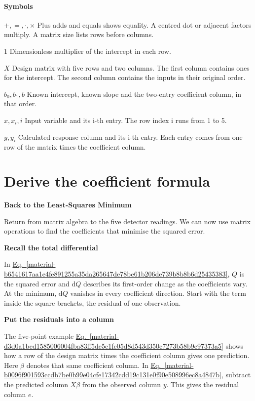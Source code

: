 \documentclass[11pt,a4paper]{article}
\begin{document}
\paragraph{Symbols}
\par\noindent\textbf{\(+,=,\cdot,\times\)} Plus adds and equals shows equality. A centred dot or adjacent factors multiply. A matrix size lists rows before columns.
\par\noindent\textbf{\(1\)} Dimensionless multiplier of the intercept in each row.
\par\noindent\textbf{\(X\)} Design matrix with five rows and two columns. The first column contains ones for the intercept. The second column contains the inputs in their original order.
\par\noindent\textbf{\(b_0,b_1,b\)} Known intercept, known slope and the two-entry coefficient column, in that order.
\par\noindent\textbf{\(x,x_i,i\)} Input variable and its i-th entry. The row index i runs from 1 to 5.
\par\noindent\textbf{\(y,y_i\)} Calculated response column and its i-th entry. Each entry comes from one row of the matrix times the coefficient column.
\medskip

\clearpage
\section{Derive the coefficient formula}
\textbf{Back to the Least-Squares Minimum}


Return from matrix algebra to the five detector readings. We can now use matrix operations to find the coefficients that minimise the squared error.


\textbf{Recall the total differential}


In \hyperref[material-b6541617aa1e4fe891255a35da265647de78be61b206de739b8b8b6d25435383]{Eq.~\ref*{material-b6541617aa1e4fe891255a35da265647de78be61b206de739b8b8b6d25435383}}, \(Q\) is the squared error and \(\mathrm dQ\) describes its first-order change as the coefficients vary. At the minimum, \(\mathrm dQ\) vanishes in every coefficient direction. Start with the term inside the square brackets, the residual of one observation.


\textbf{Put the residuals into a column}


The five-point example \hyperref[material-d3d0a1bed1585006004fba83ff5de5c1fc05d8d543d350c7273b58b9e97373a5]{Eq.~\ref*{material-d3d0a1bed1585006004fba83ff5de5c1fc05d8d543d350c7273b58b9e97373a5}} shows how a row of the design matrix times the coefficient column gives one prediction. Here \(\beta\) denotes that same coefficient column. In \hyperref[material-b0096f901593ccdb7be0b99e04cfe17342cdd19c131e0f90e508996ec8a4847b]{Eq.~\ref*{material-b0096f901593ccdb7be0b99e04cfe17342cdd19c131e0f90e508996ec8a4847b}}, subtract the predicted column \(X\beta\) from the observed column \(y\). This gives the residual column \(e\).
\end{document}
